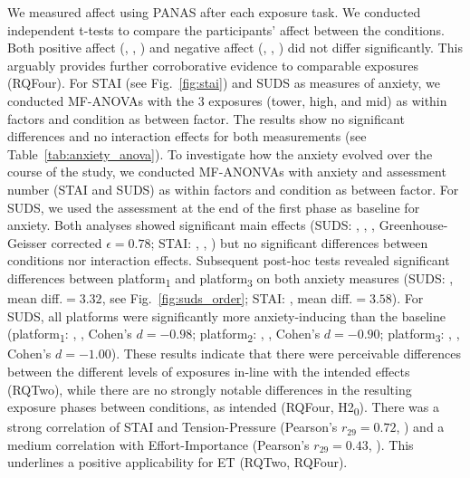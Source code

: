 We measured affect using PANAS after each exposure task. We conducted independent t-tests to compare the participants' affect between the conditions. Both positive affect (, , ) and negative affect (, , ) did not differ significantly. This arguably provides further corroborative evidence to comparable exposures (\acl{RQFour}).
For STAI (see Fig.~\ref{fig:stai}) and SUDS as measures of anxiety, we conducted MF-ANOVAs with the $3$ exposures (tower, high, and mid) as within factors and condition as between factor. The results show no significant differences and no interaction effects for both measurements (see Table~\ref{tab:anxiety_anova}).
To investigate how the anxiety evolved over the course of the study, we conducted MF-ANONVAs with anxiety and assessment number (STAI and SUDS) as within factors and condition as between factor. For SUDS, we used the assessment at the end of the first phase as baseline for anxiety. 
Both analyses showed significant main effects (SUDS: , , , Greenhouse-Geisser corrected $\epsilon{=}0.78$; STAI: , , ) but no significant differences between conditions nor interaction effects. Subsequent post-hoc tests revealed significant differences between platform\textsubscript{1} and platform\textsubscript{3} on both anxiety measures (SUDS: ,  mean diff.${=}3.32$, see Fig.~\ref{fig:suds_order}; STAI: ,  mean diff.${=}3.58$). 
For SUDS, all platforms were significantly more anxiety-inducing than the baseline (platform\textsubscript{1}: , , Cohen's $d{=}{-}0.98$; platform\textsubscript{2}: , , Cohen's $d{=}{-}0.90$; platform\textsubscript{3}: , , Cohen's $d{=}{-}1.00$).
These results indicate that there were perceivable differences between the different levels of exposures in-line with the intended effects (\acl{RQTwo}), while there are no strongly notable differences in the resulting exposure phases between conditions, as intended (\acl{RQFour}, H2\textsubscript{0}).
There was a strong correlation of STAI and Tension-Pressure (Pearson's $r_{29}{=}0.72$, ) and a medium correlation with Effort-Importance (Pearson's $r_{29}{=}0.43$, ). This underlines a positive applicability for \ac{ET} %
 (\acl{RQTwo}, \acl{RQFour}).

